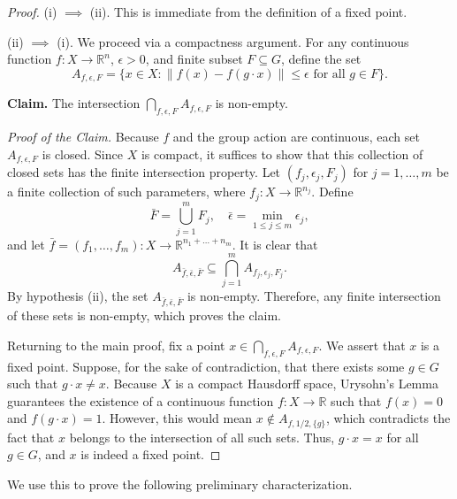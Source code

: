 \begin{proof}
    (i) $\implies$ (ii). This is immediate from the definition of a fixed point.

    (ii) $\implies$ (i). We proceed via a compactness argument. For any continuous function $f: X \to \mathbb{R}^n$, $\epsilon > 0$, and finite subset $F \subseteq G$, define the set
    $$
        A_{f, \epsilon, F} = \{x \in X : \|f(x) - f(g \cdot x)\| \le \epsilon \text{ for all } g \in F\}.
    $$

    \textbf{Claim.} The intersection $\bigcap_{f, \epsilon, F} A_{f, \epsilon, F}$ is non-empty.

    \textit{Proof of the Claim.} Because $f$ and the group action are continuous, each set $A_{f, \epsilon, F}$ is closed. Since $X$ is compact, it suffices to show that this collection of closed sets has the finite intersection property. Let $(f_j, \epsilon_j, F_j)$ for $j = 1, \dots, m$ be a finite collection of such parameters, where $f_j : X \to \mathbb{R}^{n_j}$. Define
    $$
        \bar{F} = \bigcup_{j=1}^m F_j, \quad \bar{\epsilon} = \min_{1 \le j \le m} \epsilon_j,
    $$
    and let $\bar{f} = (f_1, \dots, f_m) : X \to \mathbb{R}^{n_1 + \dots + n_m}$. It is clear that
    $$
        A_{\bar{f}, \bar{\epsilon}, \bar{F}} \subseteq \bigcap_{j=1}^m A_{f_j, \epsilon_j, F_j}.
    $$
    By hypothesis (ii), the set $A_{\bar{f}, \bar{\epsilon}, \bar{F}}$ is non-empty. Therefore, any finite intersection of these sets is non-empty, which proves the claim.

    Returning to the main proof, fix a point $x \in \bigcap_{f, \epsilon, F} A_{f, \epsilon, F}$. We assert that $x$ is a fixed point. Suppose, for the sake of contradiction, that there exists some $g \in G$ such that $g \cdot x \neq x$. Because $X$ is a compact Hausdorff space, Urysohn's Lemma guarantees the existence of a continuous function $f: X \to \mathbb{R}$ such that $f(x) = 0$ and $f(g \cdot x) = 1$. However, this would mean $x \notin A_{f, 1/2, \{g\}}$, which contradicts the fact that $x$ belongs to the intersection of all such sets. Thus, $g \cdot x = x$ for all $g \in G$, and $x$ is indeed a fixed point.
\end{proof}


We use this to prove the following preliminary characterization.



